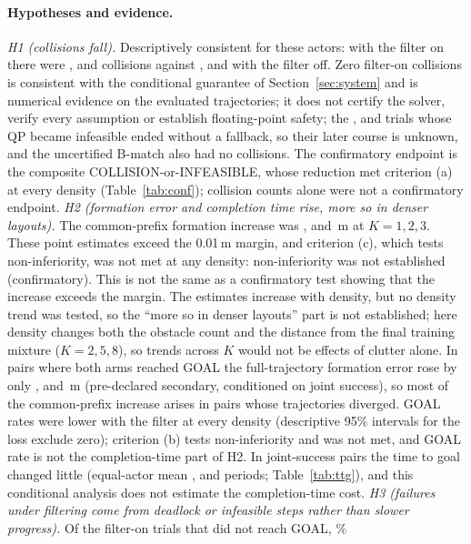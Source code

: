 \documentclass[11pt]{article}
\begin{document}
\paragraph{Hypotheses and evidence.}
\emph{H1 (collisions fall).} Descriptively consistent for these actors: with the filter on there were
\CollOnone, \CollOntwo{} and \CollOnthree{} collisions against \CollOffone, \CollOfftwo{} and
\CollOffthree{} with the filter off. Zero filter-on collisions is consistent with the conditional guarantee
of Section~\ref{sec:system} and is numerical evidence on the evaluated trajectories; it does not certify
the solver, verify every assumption or establish floating-point safety; the \InfOnone, \InfOntwo{} and \InfOnthree{} trials whose QP became
infeasible ended without a fallback, so their later course is unknown, and the uncertified B-match also
had no collisions. The confirmatory endpoint is the composite
COLLISION-or-INFEASIBLE, whose reduction met criterion (a) at every density (Table~\ref{tab:conf});
collision counts alone were not a confirmatory endpoint.
\emph{H2 (formation error and completion time rise, more so in denser layouts).} The common-prefix
formation increase was \Cincone, \Cinctwo{} and \Cincthree\,m at $K=1,2,3$. These point estimates
exceed the 0.01\,m margin, and criterion (c), which tests non-inferiority, was not met at any
density: non-inferiority was not established (confirmatory). This is not the same as a confirmatory
test showing that the increase exceeds the margin. The estimates increase with
density, but no density trend was tested, so the ``more so in denser layouts'' part is not
established; here density changes both the obstacle count and the distance from the final training
mixture ($K=2,5,8$), so trends across $K$ would not be effects of clutter alone. In pairs where both arms
reached GOAL the full-trajectory formation error rose by only \BothGoalFormone, \BothGoalFormtwo{} and
\BothGoalFormthree\,m (pre-declared secondary, conditioned on joint success), so most of the
common-prefix increase arises in pairs whose trajectories diverged. GOAL rates were lower with the
filter at every density (descriptive 95\% intervals for the loss exclude zero); criterion (b) tests
non-inferiority and was not met, and GOAL rate is not the completion-time part of H2. In joint-success
pairs the time to goal changed little (equal-actor mean \TtgEqOnone, \TtgEqOntwo{} and \TtgEqOnthree{} periods;
Table~\ref{tab:ttg}), and this conditional analysis does not estimate the completion-time cost.
\emph{H3 (failures under filtering come from deadlock or infeasible steps rather than slower
progress).} Of the \HthreeNongoalAll{} filter-on trials that did not reach GOAL, \HthreeShareAll\%
\end{document}
